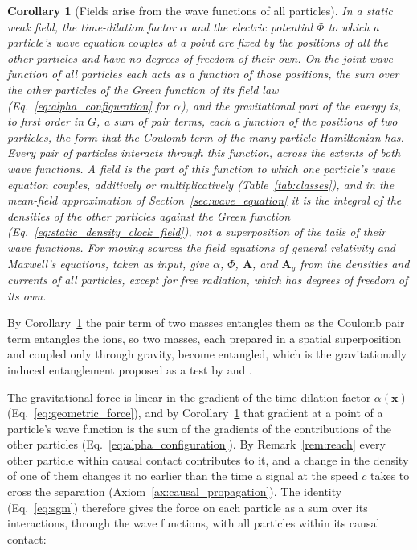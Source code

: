 \documentclass[aps,prd,onecolumn,tightenlines,nofootinbib,notitlepage,11pt,floatfix]{revtex4-2}
\theoremstyle{indentedtheorem}
\newtheorem{corollary}{Corollary}
\begin{document}
\begin{corollary}[Fields arise from the wave functions of all particles]\label{cor:fields}
In a static weak field, the time-dilation factor $\alpha$ and the electric potential $\Phi$ to which a particle's wave equation couples at a point are fixed by the positions of all the other particles and have no degrees of freedom of their own. On the joint wave function of all particles each acts as a function of those positions, the sum over the other particles of the Green function of its field law (Eq.~\eqref{eq:alpha_configuration} for $\alpha$), and the gravitational part of the energy is, to first order in $G$, a sum of pair terms, each a function of the positions of two particles, the form that the Coulomb term of the many-particle Hamiltonian has. Every pair of particles interacts through this function, across the extents of both wave functions. A field is the part of this function to which one particle's wave equation couples, additively or multiplicatively (Table~\ref{tab:classes}), and in the mean-field approximation of Section~\ref{sec:wave_equation} it is the integral of the densities of the other particles against the Green function (Eq.~\eqref{eq:static_density_clock_field}), not a superposition of the tails of their wave functions. For moving sources the field equations of general relativity and Maxwell's equations, taken as input, give $\alpha$, $\Phi$, $\mathbf{A}$, and $\mathbf{A}_g$ from the densities and currents of all particles, except for free radiation, which has degrees of freedom of its own.
\end{corollary}

By Corollary~\ref{cor:fields} the pair term of two masses entangles them as the Coulomb pair term entangles the ions, so two masses, each prepared in a spatial superposition and coupled only through gravity, become entangled, which is the gravitationally induced entanglement proposed as a test by \citet{Bose2017Spin} and \citet{Marletto2017Gravitationally}.

The gravitational force is linear in the gradient of the time-dilation factor $\alpha(\mathbf{x})$ (Eq.~\eqref{eq:geometric_force}), and by Corollary~\ref{cor:fields} that gradient at a point of a particle's wave function is the sum of the gradients of the contributions of the other particles (Eq.~\eqref{eq:alpha_configuration}). By Remark~\ref{rem:reach} every other particle within causal contact contributes to it, and a change in the density of one of them changes it no earlier than the time a signal at the speed $c$ takes to cross the separation (Axiom~\ref{ax:causal_propagation}). The identity (Eq.~\eqref{eq:sgm}) therefore gives the force on each particle as a sum over its interactions, through the wave functions, with all particles within its causal contact:
\end{document}
